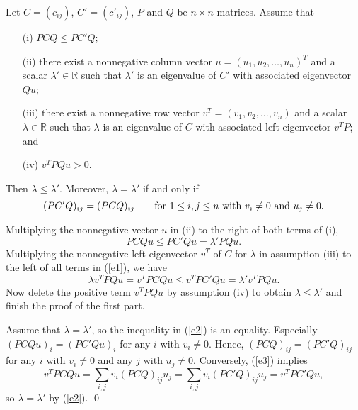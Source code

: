 \documentclass{article}
\begin{document}
\begin{thm}
 Let $C=(c_{ij})$, $C'=(c'_{ij})$, $P$ and $Q$ be  $n\times n$ matrices.
Assume that
\begin{enumerate}
\item[(i)]    $PCQ\leq PC'Q$;
\item[(ii)]  there exist a nonnegative column vector $u=(u_1, u_2, \ldots, u_n)^T$  and a scalar $\lambda'\in \mathbb{R}$ such that $\lambda'$ is an eigenvalue of $C'$ with associated eigenvector $Qu$;
\item[(iii)] there exist a nonnegative row vector $v^T=(v_1, v_2, \ldots, v_n)$  and a scalar $\lambda\in \mathbb{R}$
such that $\lambda$ is an eigenvalue of $C$ with associated  left eigenvector $v^TP$; and
\item[(iv)] $v^TPQu>0.$
\end{enumerate}
 Then $\lambda\leq \lambda'$.
    Moreover, $\lambda=\lambda'$ 
if and only if
    \begin{equation*}
        \label{e3}
(PC'Q)_{ij}=(PCQ)_{ij}\qquad \hbox{for~}1\leq i, j\leq n \hbox{~with~} v_i\ne 0 \hbox{~and~} u_j\ne 0.
\end{equation*}
\end{thm}


\begin{pf}
            Multiplying the nonnegative vector $u$ in (ii) to the right of both terms of  (i),
        \begin{equation}
            \label{e1}
            PCQu\leq PC'Qu=\lambda'PQu.
        \end{equation}
        Multiplying the nonnegative left eigenvector $v^T$ of $C$ for $\lambda$ in assumption (iii) to the left of all terms  in (\ref{e1}), we have
        \begin{equation}
            \label{e2}
            \lambda v^TPQu=v^TPCQu\leq v^TPC'Qu=\lambda' v^TPQu.
        \end{equation}
        Now delete the positive term $v^TPQu$ by assumption (iv) to obtain $\lambda\leq \lambda'$ and finish the proof of the first part.



        Assume that $\lambda=\lambda'$, so the inequality in (\ref{e2}) is an equality.  Especially $(PCQu)_i=(PC'Qu)_i$ for any $i$ with $v_i\not=0.$ Hence, $(PCQ)_{ij}=(PC'Q)_{ij}$ for any $i$ with $v_i\not=0$ and any $j$ with $u_j\not=0.$
         Conversely, (\ref{e3}) implies $$v^TPCQu=\sum_{i,j} v_i(PCQ)_{ij}u_j=\sum_{i,j} v_i(PC'Q)_{ij}u_j=v^TPC'Qu,$$ so
            $\lambda=\lambda'$ by (\ref{e2}). \qed
            
 \end{pf}
\end{document}
